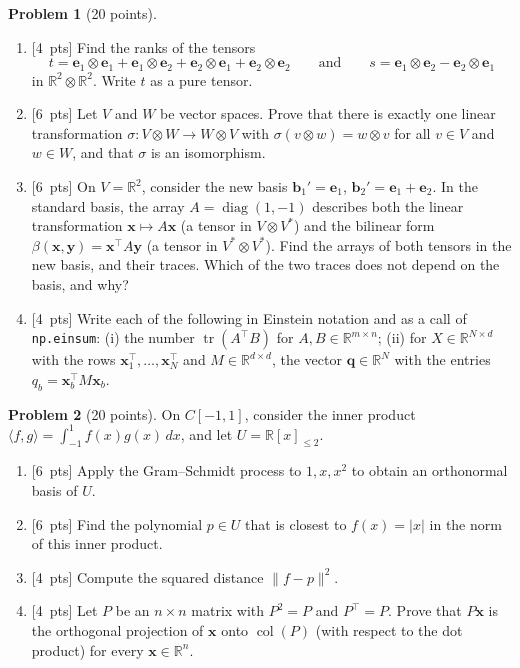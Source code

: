 \documentclass[11pt]{article}
\theoremstyle{definition}
\newtheorem{problem}{Problem}
\newcommand{\norm}[1]{\lVert #1 \rVert}
\newcommand{\ip}[2]{\langle #1, #2 \rangle}
\newcommand{\pts}[1]{\textup{[#1~pts]}}
\DeclareMathOperator{\col}{col}
\DeclareMathOperator{\tr}{tr}
\DeclareMathOperator{\diag}{diag}
\begin{document}
\begin{problem}[20 points]\label{pr:mid-tensors}
    \begin{enumerate}[label=(\alph*)]
        \item \pts{4} Find the ranks of the tensors
        \[t = \mathbf{e}_1 \otimes \mathbf{e}_1 + \mathbf{e}_1 \otimes \mathbf{e}_2 + \mathbf{e}_2 \otimes \mathbf{e}_1 + \mathbf{e}_2 \otimes \mathbf{e}_2 \qquad \text{and} \qquad s = \mathbf{e}_1 \otimes \mathbf{e}_2 - \mathbf{e}_2 \otimes \mathbf{e}_1\]
        in $\mathbb{R}^2 \otimes \mathbb{R}^2$. Write $t$ as a pure tensor.
        \item \pts{6} Let $V$ and $W$ be vector spaces. Prove that there is exactly one linear transformation $\sigma: V \otimes W \to W \otimes V$ with $\sigma(v \otimes w) = w \otimes v$ for all $v \in V$ and $w \in W$, and that $\sigma$ is an isomorphism.
        \item \pts{6} On $V = \mathbb{R}^2$, consider the new basis $\mathbf{b}_1' = \mathbf{e}_1$, $\mathbf{b}_2' = \mathbf{e}_1 + \mathbf{e}_2$. In the standard basis, the array $A = \diag(1, -1)$ describes both the linear transformation $\mathbf{x} \mapsto A\mathbf{x}$ (a tensor in $V \otimes V^*$) and the bilinear form $\beta(\mathbf{x}, \mathbf{y}) = \mathbf{x}^\top A\mathbf{y}$ (a tensor in $V^* \otimes V^*$). Find the arrays of both tensors in the new basis, and their traces. Which of the two traces does not depend on the basis, and why?
        \item \pts{4} Write each of the following in Einstein notation and as a call of \texttt{np.einsum}: (i) the number $\tr(A^\top B)$ for $A, B \in \mathbb{R}^{m \times n}$; (ii) for $X \in \mathbb{R}^{N \times d}$ with the rows $\mathbf{x}_1^\top, \ldots, \mathbf{x}_N^\top$ and $M \in \mathbb{R}^{d \times d}$, the vector $\mathbf{q} \in \mathbb{R}^N$ with the entries $q_b = \mathbf{x}_b^\top M\mathbf{x}_b$.
    \end{enumerate}
\end{problem}

\begin{problem}[20 points]\label{pr:mid-projection}
    On $C[-1, 1]$, consider the inner product $\ip{f}{g} = \int_{-1}^1 f(x)g(x)\, dx$, and let $U = \mathbb{R}[x]_{\leq 2}$.
    \begin{enumerate}[label=(\alph*)]
        \item \pts{6} Apply the Gram--Schmidt process to $1, x, x^2$ to obtain an orthonormal basis of $U$.
        \item \pts{6} Find the polynomial $p \in U$ that is closest to $f(x) = |x|$ in the norm of this inner product.
        \item \pts{4} Compute the squared distance $\norm{f - p}^2$.
        \item \pts{4} Let $P$ be an $n \times n$ matrix with $P^2 = P$ and $P^\top = P$. Prove that $P\mathbf{x}$ is the orthogonal projection of $\mathbf{x}$ onto $\col(P)$ (with respect to the dot product) for every $\mathbf{x} \in \mathbb{R}^n$.
    \end{enumerate}
\end{problem}
\end{document}
